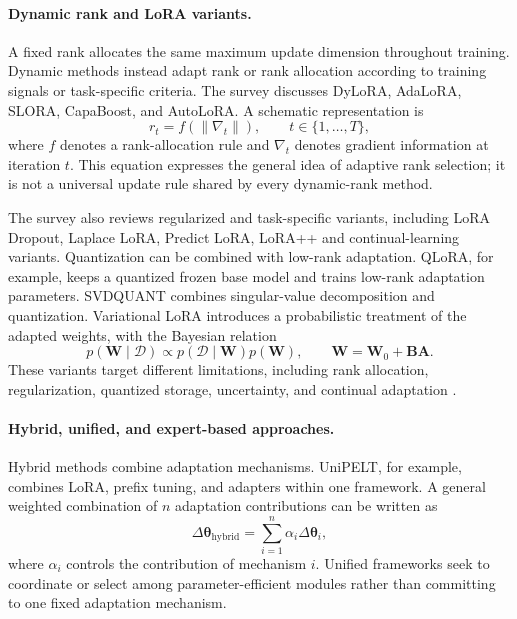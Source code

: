 \paragraph{Dynamic rank and LoRA variants.}
A fixed rank allocates the same maximum update dimension throughout training.
Dynamic methods instead adapt rank or rank allocation according to training
signals or task-specific criteria. The survey discusses DyLoRA, AdaLoRA,
SLORA, CapaBoost, and AutoLoRA. A schematic representation is
\begin{equation}
    r_t=f(\|\nabla_t\|),
    \qquad t\in\{1,\ldots,T\},
    \label{eq:peft-dynamic-rank}
\end{equation}
where $f$ denotes a rank-allocation rule and $\nabla_t$ denotes gradient
information at iteration $t$. This equation expresses the general idea of
adaptive rank selection; it is not a universal update rule shared by every
dynamic-rank method.

The survey also reviews regularized and task-specific variants, including
LoRA Dropout, Laplace LoRA, Predict LoRA, LoRA++ and continual-learning
variants. Quantization can be combined with low-rank adaptation. QLoRA, for
example, keeps a quantized frozen base model and trains low-rank adaptation
parameters. SVDQUANT combines singular-value decomposition and quantization.
Variational LoRA introduces a probabilistic treatment of the adapted weights,
with the Bayesian relation
\begin{equation}
    p(\mathbf{W}\mid\mathcal{D})
    \propto
    p(\mathcal{D}\mid\mathbf{W})p(\mathbf{W}),
    \qquad
    \mathbf{W}=\mathbf{W}_0+\mathbf{B}\mathbf{A}.
    \label{eq:peft-variational-lora}
\end{equation}
These variants target different limitations, including rank allocation,
regularization, quantized storage, uncertainty, and continual adaptation
\parencite{prottasha2025peft}.

\paragraph{Hybrid, unified, and expert-based approaches.}
Hybrid methods combine adaptation mechanisms. UniPELT, for example, combines
LoRA, prefix tuning, and adapters within one framework. A general weighted
combination of $n$ adaptation contributions can be written as
\begin{equation}
    \Delta\boldsymbol{\theta}_{\mathrm{hybrid}}
    =
    \sum_{i=1}^{n}\alpha_i
    \Delta\boldsymbol{\theta}_i,
    \label{eq:peft-hybrid-update}
\end{equation}
where $\alpha_i$ controls the contribution of mechanism $i$. Unified
frameworks seek to coordinate or select among parameter-efficient modules
rather than committing to one fixed adaptation mechanism.

